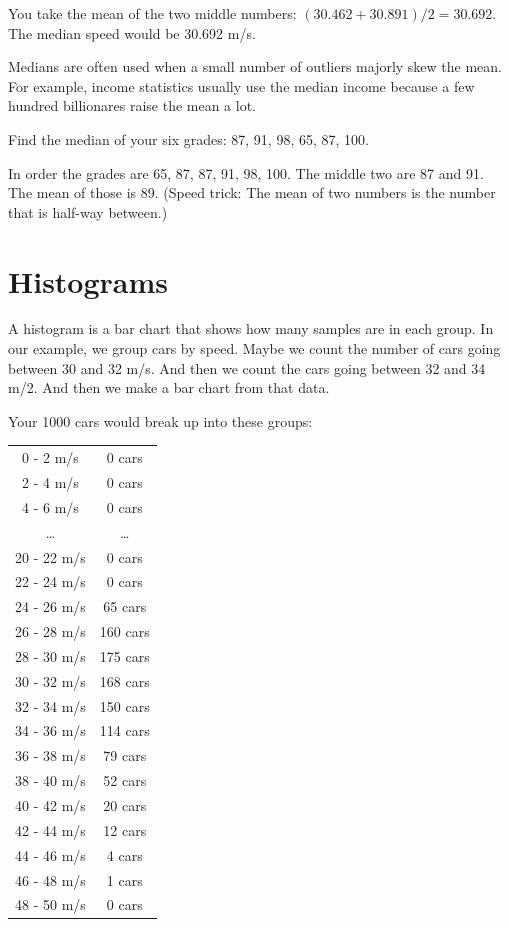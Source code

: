 You take the mean of the two middle numbers: $(30.462 + 30.891)/2 =
30.692$.  The median speed would be 30.692 m/s.

Medians are often used when a small number of outliers majorly skew the
mean. For example, income statistics usually use the median income
because a few hundred billionares raise the mean a lot.

\begin{Exercise}[title={Median Grade}, label=grades_median]

  Find the median of your six grades: 87, 91, 98, 65, 87, 100.

\end{Exercise}
\begin{Answer}[ref=grades_median]

  In order the grades are 65, 87, 87, 91, 98, 100.  The middle two are 87
  and 91. The mean of those is 89. (Speed trick: The mean of two numbers is the
  number that is half-way between.)
  
 \end{Answer}


\section{Histograms}

A histogram is a bar chart that shows how many samples are in each
group. In our example, we group cars by speed. Maybe we count the
number of cars going between 30 and 32 m/s.  And then we count the
cars going between 32 and 34 m/2. And then we make a bar chart from
that data.

Your 1000 cars would break up into these groups:

\begin{tabular}{ c | c }
0 - 2 m/s & 0 cars \\
2 - 4 m/s & 0 cars \\
4 - 6 m/s & 0 cars \\
\ldots & \ldots \\
20 - 22 m/s & 0 cars \\
22 - 24 m/s & 0 cars \\
24 - 26 m/s & 65 cars \\
26 - 28 m/s & 160 cars \\
28 - 30 m/s & 175 cars \\
30 - 32 m/s & 168 cars \\
32 - 34 m/s & 150 cars \\
34 - 36 m/s & 114 cars \\
36 - 38 m/s & 79 cars \\
38 - 40 m/s & 52 cars \\
40 - 42 m/s & 20 cars \\
42 - 44 m/s & 12 cars \\
44 - 46 m/s & 4 cars \\
46 - 48 m/s & 1 cars \\
48 - 50 m/s & 0 cars \\
\end{tabular}

